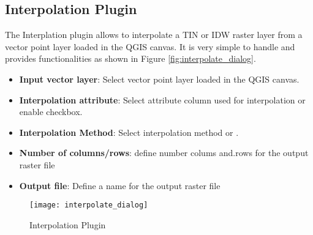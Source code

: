 \subsection{Interpolation Plugin}

\updatedisclaimer

The Interplation plugin allows to interpolate a TIN or IDW raster layer from a vector 
point layer loaded in the QGIS canvas. It is very simple to handle and provides 
functionalities as shown in Figure \ref{fig:interpolate_dialog}.

\begin{itemize}
\item \textbf{Input vector layer}: Select vector point layer loaded in the QGIS canvas.
\item \textbf{Interpolation attribute}: Select attribute column used for interpolation or 
enable  checkbox.
\item \textbf{Interpolation Method}: Select interpolation method  or .
\item \textbf{Number of columns/rows}: define number colums and.rows for the output raster file
\item \textbf{Output file}: Define a name for the output raster file
\end{itemize}

\begin{figure}[ht]
   \begin{center}
   \caption{Interpolation Plugin \nixcaption}\label{fig:interpolation_dialog}\smallskip
   \texttt{[image: interpolate\_dialog]}
\end{center}  
\end{figure}

